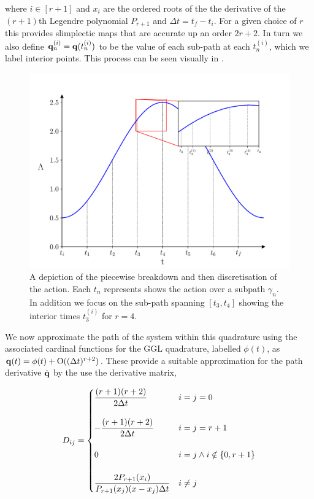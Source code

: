 
where $i \in [r + 1]$ and $x_i$ are the ordered roots of the the derivative of the $(r + 1)$th Legendre polynomial $P_{r + 1}$ and $\Delta t = t_f - t_i$. For a given choice of $r$ this provides slimplectic maps that are accurate up an order $2r + 2$\cite{tsangSLIMPLECTICINTEGRATORSVARIATIONAL2015}. In turn we also define $\vb{q}_n^{(i)} = \vb{q}(t^{(i)}_n)$ to be the value of each sub-path at each $t^{(i)}_n$, which we label interior points. This process can be seen visually in .

\begin{figure}[t]
  \includegraphics[width=\columnwidth]{figures/si-process.pdf}
  \caption{A depiction of the piecewise breakdown and then discretisation of the action. Each $t_n$ represents shows the action over a subpath $\gamma_n$. In addition we focus on the sub-path spanning $[t_3, t_4]$ showing the interior times $t_{3}^{(i)}$ for $r = 4$.}
  \label{fig:si-process}
\end{figure}

We now approximate the path of the system within this quadrature using the associated cardinal functions for the GGL quadrature, labelled $\phi(t)$, as \(\vb q(t) = \phi(t) + \mathord{\mathrm{O}}((\Delta t)^{r + 2})\). These provide a suitable approximation for the path derivative $\dot{\vb q}$ by the use the derivative matrix,

\begin{equation}
\label{eq:dij}
  D_{ij} = \begin{cases}
  	\dfrac{(r + 1)(r + 2)}{2\Delta t} &i = j = 0 \\\\
  	-\dfrac{(r + 1)(r + 2)}{2\Delta t} & i = j = r + 1 \\\\
  	0 & i = j \land i \notin \left\{0, r + 1\right\} \\\\
  	\dfrac{2P_{r + 1}(x_i)}{P_{r+1}(x_j)(x - x_j)\Delta t} & i\neq j
  \end{cases}
\end{equation}

